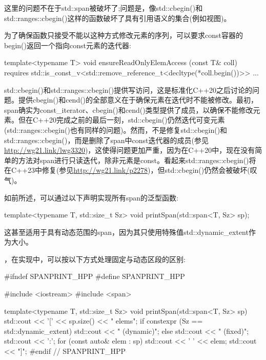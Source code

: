 这里的问题不在于std::span被破坏了;问题是，像std::cbegin()和std::ranges::cbegin()这样的函数破坏了具有引用语义的集合(例如视图)。

为了确保函数只接受不能以这种方式修改元素的序列，可以要求const容器的begin()返回一个指向const元素的迭代器:

\begin{cpp}
template<typename T>
void ensureReadOnlyElemAccess (const T& coll)
requires std::is_const_v<std::remove_reference_t<decltype(*coll.begin())>>
{
	...
}
\end{cpp}

std::cbegin()和std::ranges::cbegin()提供写访问，这是标准化C++20之后讨论的问题。提供cbegin()和cend()的全部意义在于确保元素在迭代时不能被修改。最初，span确实为const\_iterator、cbegin()和cend()类型提供了成员，以确保不能修改元素。但在C++20完成之前的最后一刻，std::cbegin()仍然迭代可变元素(std::ranges::cbegin()也有同样的问题)。然而，不是修复std::cbegin()和std::ranges::cbegin()，而是删除了span中const迭代器的成员(参见\url{http://wg21.link/lwg3320})，这使得问题更加严重，因为在C++20中，现在没有简单的方法对span进行只读迭代，除非元素是const。看起来std::ranges::cbegin()将在C++23中修复(参见\url{http://wg21.link/p2278})，但std::cbegin()仍然会被破坏(叹气)。


如前所述，可以通过以下声明实现所有span的泛型函数:

\begin{cpp}
template<typename T, std::size_t Sz>
void printSpan(std::span<T, Sz> sp);
\end{cpp}

这甚至适用于具有动态范围的span，因为其只使用特殊值std::dynamic\_extent作为大小。

，在实现中，可以按以下方式处理固定与动态区段的区别:


\begin{cpp}
#ifndef SPANPRINT_HPP
#define SPANPRINT_HPP

#include <iostream>
#include <span>

template<typename T, std::size_t Sz>
void printSpan(std::span<T, Sz> sp)
{
	std::cout << '[' << sp.size() << " elems";
	if constexpr (Sz == std::dynamic_extent) {
		std::cout << " (dynamic)";
	}
	else {
		std::cout << " (fixed)";
	}
	std::cout << ':';
	for (const auto& elem : sp) {
		std::cout << ' ' << elem;
	}
	std::cout << "]\n";
	} 
#endif // SPANPRINT_HPP
\end{cpp}

